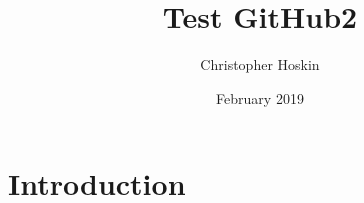 \documentclass{article}
\title{Test GitHub2}
\author{Christopher Hoskin}
\date{February 2019}
\begin{document}
\maketitle

\section{Introduction}
\end{document}
